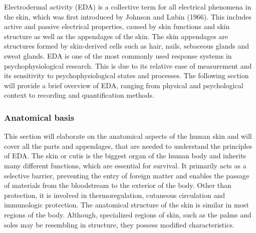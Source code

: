 


Electrodermal activity (EDA) is a collective term for all electrical phenomena in the skin, which was first introduced by Johnson and Lubin (1966). This includes active and passive electrical properties, caused by skin functions and skin structure as well as the appendages of the skin.%
The skin appendages are structures formed by skin-derived cells such as hair, nails, sebaceous glands and sweat glands. EDA is one of the most commonly used response systems in psychophysiological research. This is due to its relative ease of measurement and its sensitivity to psychophysiological states and processes. The following section will provide a brief overview of EDA, ranging from physical and psychological context to recording and quantification methods.

\subsubsection{Anatomical basis} 
This section will elaborate on the anatomical aspects of the human skin and will cover all the parts and appendages, that are needed to understand the principles of EDA. The skin or cutis is the biggest organ of the human body and inherits many different functions, which are essential for survival. It primarily acts as a selective barrier, preventing the entry of foreign matter and enables the passage of materials from the bloodstream to the exterior of the body. Other than protection, it is involved in thermoregulation, cutaneous circulation and immunologic protection.  
The anatomical structure of the skin is similar in most regions of the body. Although, specialized regions of skin, such as the palms and soles may be resembling in structure, they possess modified characteristics.%

